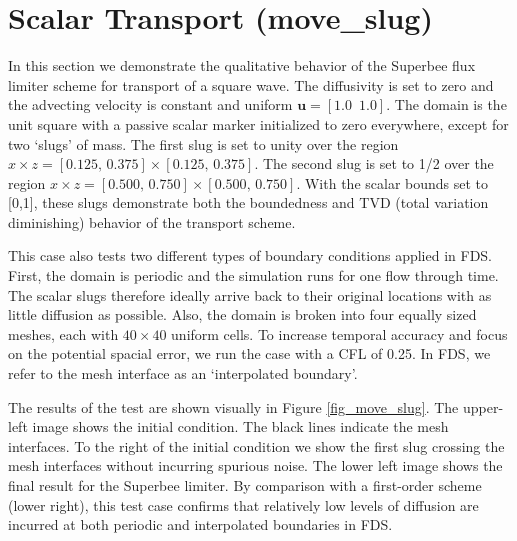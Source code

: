 \documentclass[11pt]{book}
\begin{document}
\clearpage

\section{Scalar Transport (move\_slug)}

In this section we demonstrate the qualitative behavior of the Superbee flux limiter scheme for transport of a square wave.
The diffusivity is set to zero and the advecting velocity is constant and uniform $\mathbf{u} = [1.0\,\,\,1.0]$.
The domain is the unit square with a passive scalar marker initialized to zero everywhere, except for two `slugs' of mass.
The first slug is set to unity over the region $x \times z = [0.125,\,0.375] \times [0.125,\,0.375]$.
The second slug is set to 1/2 over the region $x \times z = [0.500,\,0.750] \times [0.500,\,0.750]$.
With the scalar bounds set to [0,1], these slugs demonstrate both the boundedness and TVD (total variation diminishing) behavior of the transport scheme.

This case also tests two different types of boundary conditions applied in FDS.  First, the domain is periodic and the simulation runs for one flow through time.
The scalar slugs therefore ideally arrive back to their original locations with as little diffusion as possible.
Also, the domain is broken into four equally sized meshes, each with $40 \times 40$ uniform cells.
To increase temporal accuracy and focus on the potential spacial error, we run the case with a CFL of 0.25.  In FDS, we refer to the mesh interface as an `interpolated boundary'.

The results of the test are shown visually in Figure \ref{fig_move_slug}.  The upper-left image shows the initial condition.
The black lines indicate the mesh interfaces.  To the right of the initial condition we show the first slug crossing the mesh interfaces without incurring spurious noise.
The lower left image shows the final result for the Superbee limiter.  By comparison with a first-order scheme (lower right),
this test case confirms that relatively low levels of diffusion are incurred at both periodic and interpolated boundaries in FDS.
\end{document}

